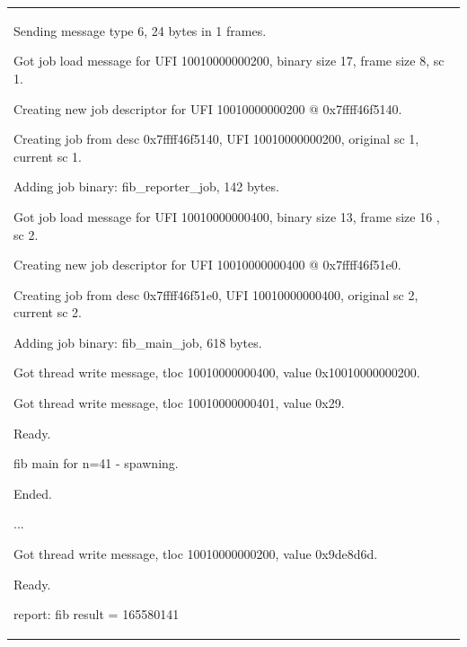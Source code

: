 \documentclass[a4paper]{article}
\begin{document}
\begin{flushleft}
\begin{supertabular}{|m{6.4018598in}|}
{ Sending message type
6, 24 bytes in 1 frames.}

{\ttfamily [Scheduler 1] Got job load message
for UFI 10010000000200, binary size 17, frame size 8, sc 1.}

{\ttfamily [Scheduler 1] Creating new job
descriptor for UFI 10010000000200 @ 0x7ffff46f5140.}

{\ttfamily [Job 10010000000200] Creating job
from desc 0x7ffff46f5140, UFI 10010000000200, original sc 1, current sc
1.}

{\ttfamily [BinariesStore] Adding job binary:
fib\_reporter\_job, 142 bytes.}

{\ttfamily [Scheduler 1] Got job load message
for UFI 10010000000400, binary size 13, frame size 16 , sc 2.}

{\ttfamily [Scheduler 1] Creating new job
descriptor for UFI 10010000000400 @ 0x7ffff46f51e0.}

{\ttfamily [Job 10010000000400] Creating job
from desc 0x7ffff46f51e0, UFI 10010000000400, original sc 2, current sc
2.}

{\ttfamily [BinariesStore] Adding job binary:
fib\_main\_job, 618 bytes.}

{\ttfamily [Scheduler 1] Got thread write
message, tloc 10010000000400, value 0x10010000000200.}

{\ttfamily [Scheduler 1] Got thread write
message, tloc 10010000000401, value 0x29.}

{\ttfamily [Job 10010000000400] Ready.}

{ fib main for n=41 - spawning.}

{\ttfamily [Job 10010000000400] Ended.}

{\ttfamily ...}

{\ttfamily [Scheduler 1] Got thread write
message, tloc 10010000000200, value 0x9de8d6d.}

{\ttfamily [Job 10010000000200] Ready.}

{ report: fib result = 165580141}


\end{supertabular}
\end{flushleft}
\end{document}
